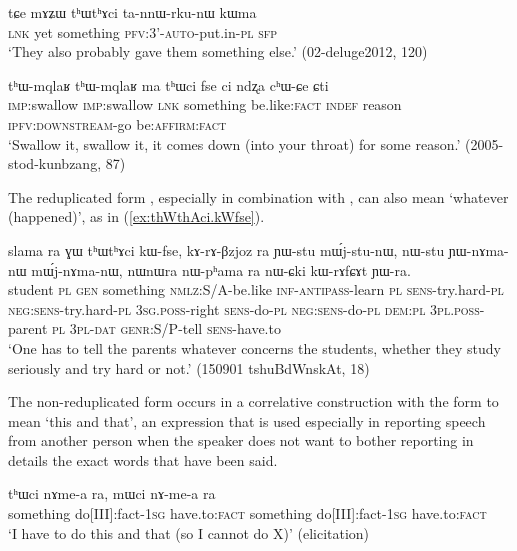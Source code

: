 \begin{exe}
\ex \label{ex:thWthAci.tannWrkunW}
\gll   tɕe mɤʑɯ tʰɯtʰɤci ta-nnɯ-rku-nɯ kɯma  \\
\textsc{lnk} yet something \textsc{pfv}:3'-\textsc{auto}-put.in-\textsc{pl} \textsc{sfp} \\
\glt `They also probably gave them something else.' (02-deluge2012, 120)
 \end{exe}
 
  \begin{exe}
\ex \label{ex:thWmqlaR}
\gll 
 tʰɯ-mqlaʁ tʰɯ-mqlaʁ ma tʰɯci fse ci ndʐa cʰɯ-ɕe ɕti \\
 \textsc{imp}:swallow  \textsc{imp}:swallow \textsc{lnk} something be.like:\textsc{fact} \textsc{indef} reason \textsc{ipfv:downstream}-go be:\textsc{affirm:fact} \\
\glt `Swallow it, swallow it, it comes down (into your throat) for some reason.' (2005-stod-kunbzang, 87)
  \end{exe}

The reduplicated form , especially in combination with , can also mean `whatever (happened)', as in (\ref{ex:thWthAci.kWfse}).
 
 \begin{exe}
\ex \label{ex:thWthAci.kWfse}
\gll  slama ra ɣɯ tʰɯtʰɤci kɯ-fse, kɤ-rɤ-βzjoz ra ɲɯ-stu mɯ́j-stu-nɯ, nɯ-stu ɲɯ-nɤma-nɯ mɯ́j-nɤma-nɯ,  nɯnɯra nɯ-pʰama ra nɯ-ɕki kɯ-rɤfɕɤt ɲɯ-ra. \\
student \textsc{pl} \textsc{gen} something \textsc{nmlz}:S/A-be.like \textsc{inf-antipass}-learn \textsc{pl} \textsc{sens}-try.hard-\textsc{pl} \textsc{neg:sens}-try.hard-\textsc{pl} \textsc{3sg.poss}-right \textsc{sens}-do-\textsc{pl} \textsc{neg:sens}-do-\textsc{pl} \textsc{dem:pl} \textsc{3pl.poss}-parent \textsc{pl} \textsc{3pl-dat} \textsc{genr}:S/P-tell \textsc{sens}-have.to \\
\glt `One has to tell the parents whatever concerns the students, whether they study seriously and try hard or not.'   (150901 tshuBdWnskAt, 18)
 \end{exe}
  
The non-reduplicated form  occurs in a correlative construction with the form  to mean `this and that', an expression that is used especially in reporting speech from another person when the speaker does not want to bother reporting in details the exact words that have been said.

\begin{exe}
\ex \label{ex:thWci.mWci}
\gll 
tʰɯci nɤme-a ra, mɯci nɤ-me-a ra \\
something do[III]:fact-\textsc{1sg} have.to:\textsc{fact} something do[III]:fact-\textsc{1sg} have.to:\textsc{fact} \\
\glt `I have to do this and that (so I cannot do X)' (elicitation)
 \end{exe}
 
